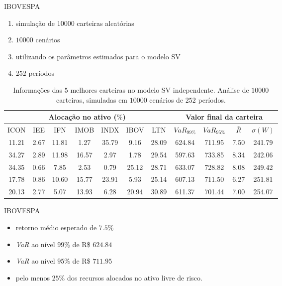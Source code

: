 \documentclass{beamer}
\begin{document}
\begin{frame}{IBOVESPA}



\begin{enumerate}
\item simulação de $10000$ carteiras aleatórias
\item $10000$ cenários
\item utilizando os parâmetros estimados para o modelo SV
\item $252$ períodos
\end{enumerate}


\begin{table}[ht]
\centering
\tiny
\begin{tabular}{ccccccc|cccc}
   \hline
  \hline
 \multicolumn{7}{c|}{Alocação no ativo ($\%$)} &  \multicolumn{4}{c}{Valor final da carteira}\\
 \hline
ICON & IEE & IFN & IMOB & INDX & IBOV & LTN & $VaR_{99\%}$ & $VaR_{95\%}$ & $\bar{R}$  & $\sigma(W)$ \\ 
  \hline
11.21 & 2.67 & 11.81 & 1.27 & 35.79 & 9.16 & 28.09 & 624.84 & 711.95 & 7.50 & 241.79 \\ 
  34.27 & 2.89 & 11.98 & 16.57 & 2.97 & 1.78 & 29.54 & 597.63 & 733.85 & 8.34 & 242.06 \\ 
  34.35 & 0.66 & 7.85 & 2.53 & 0.79 & 25.12 & 28.71 & 633.07 & 728.82 & 8.08 & 249.42 \\ 
  17.78 & 0.86 & 10.60 & 15.77 & 23.91 & 5.93 & 25.14 & 607.13 & 711.50 & 6.27 & 251.81 \\ 
  20.13 & 2.77 & 5.07 & 13.93 & 6.28 & 20.94 & 30.89 & 611.37 & 701.44 & 7.00 & 254.07 \\ 
   \hline
      \hline
\end{tabular}
      \caption{\scriptsize{Informações das $5$ melhores carteiras no modelo SV independente. Análise de $10000$ carteiras, simuladas em $10000$ cenários de $252$ períodos.}}
\label{tab:carteirasim}
\end{table}

\end{frame}


 \begin{frame}{IBOVESPA}


\begin{itemize}
\item retorno médio esperado de $7.5\%$
\item \textit{VaR} ao nível $99\%$  de R\$ $624.84$
\item \textit{VaR} ao nível $95\%$ de R\$ $711.95$
\item pelo menos $25\%$ dos recursos alocados no ativo livre de risco.
\end{itemize}

\end{frame}
\end{document}
